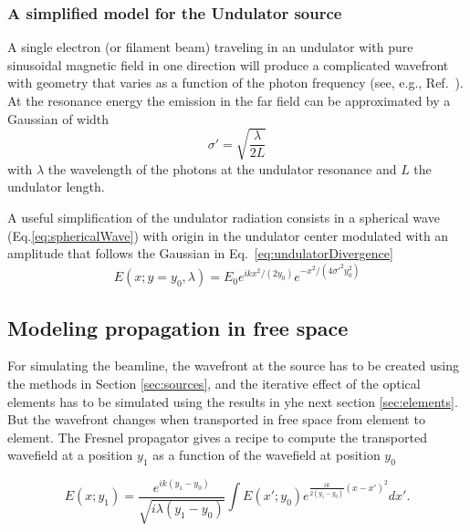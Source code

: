 \documentclass{iucr}              %
\begin{document}
\subsubsection{A simplified model for the Undulator source}
\label{sec:undulator}

A single electron (or filament beam) traveling in an undulator with pure sinusoidal magnetic field in one direction will produce a complicated wavefront with geometry that varies as a function of the photon frequency (see, e.g., Ref.~\cite{elleaume}). At the resonance energy the emission in the far field can be approximated by a Gaussian of width \cite{elleaume}
\begin{equation}
\label{eq:undulatorDivergence}
    \sigma' = \sqrt{\frac{\lambda}{2 L}}
\end{equation}
with $\lambda$ the wavelength of the photons at the undulator resonance and $L$ the undulator length. 

A useful simplification of the undulator radiation consists in a spherical wave (Eq.\ref{eq:sphericalWave}) with origin in the undulator center modulated with an amplitude that follows the Gaussian in Eq.~\ref{eq:undulatorDivergence}
\begin{equation}
    E(x;y=y_0,\lambda) = E_0 e^{i k x^2 / (2 y_0)} e^{-x^2/(4 \sigma'^2 y_0^2)}
\end{equation}



\subsection{Modeling propagation in free space}
\label{sec:propagation}

For simulating the beamline, the wavefront at the source has to be created using the methods in Section \ref{sec:sources}, and the iterative effect of the optical elements has to be simulated using the results in yhe next section \ref{sec:elements}. But the wavefront changes when transported in free space from element to element. The Fresnel propagator \cite{goodmanfourier} gives a recipe to compute the transported wavefield at a position $y_1$ as a function of the wavefield at position $y_0$

\begin{equation}\label{eq:fresnelPropagator}
E(x;y_1) =  \frac{e^{i k (y_1-y_0)}}{\sqrt{i \lambda (y_1-y_0)}} \int E(x';y_0) e^{ \frac{i k}{2 (y_1-y_0)}  (x-x')^2  }  dx'.
\end{equation}
\end{document}
